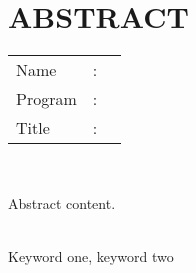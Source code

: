 %
%
%

\chapter*{ABSTRACT}

\vspace*{0.2cm}

\noindent \begin{tabular}{l l p{11.0cm}}
	Name&: & \penulis \\
	Program&: & \program \\
	Title&: & \judulInggris \\
\end{tabular} \\

\vspace*{0.5cm}

\noindent Abstract content. \\

\vspace*{0.2cm}

\noindent {} \\ Keyword one, keyword two \\

\newpage

